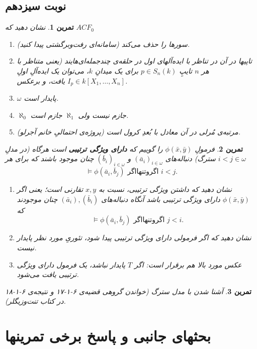 \documentclass[12pt,a4paper]{report}
\theoremstyle{colorhead}
\newtheorem{tam}{تمرین}
\begin{document}
\section{نوبت سیزدهم}
\begin{tam}
نشان دهید که
$ACF_0$
\begin{enumerate}
\item 
سورها را حذف می‌کند (سامانه‌ای رفت‌وبرگشتی پیدا کنید).
\item 
تاپیها در آن در تناظر با ایده‌آلهای اول در حلقه‌ی چندجمله‌ای‌‌هایند (یعنی متناظر با هر
$n$
تایپِ
$p\in S_n(k)$
برای یک میدانِ
$k$،
می‌توان یک ایده‌آلِ اولِ
$I_p\in k[X_1,\ldots,X_n]$
یافت، و  برعکس. 
\item 
$\omega$
پایدار است.
\item 
$\aleph_0$
جازم نیست ولی 
$\aleph_1$
جازم است.
\item 
مرتبه‌ی مُرلی در آن معادل با  بُعدِ کرول است (پروژه‌ی احتمالیِ خانم آجرلو).
\end{enumerate}
\end{tam}
\begin{tam}
فرمولِ
$\phi(\bar{x},\bar{y})$
را گوییم که\textbf{ دارای ویژگی ترتیبی} است هرگاه 
(در مدلِ سترگ) دنباله‌های
$(\bar{a}_i)_{i\in \omega}$
و
$(\bar{b}_i)_{i\in \omega}$
چنان موجود باشند که برای هر
$i<j\in \omega$
\[
\models \phi(\bar{a}_i,\bar{b}_j)
\text{ اگروتنهااگر } i<j.
\]
\begin{enumerate}
\item 
نشان دهید که داشتن ویژگی ترتیبی، نسبت به
$x,y$
تقارنی است؛ یعنی اگر
$\phi(\bar{x},\bar{y})$
دارای ویژگی ترتیبی باشد آنگاه دنباله‌های
$(\bar{a}_i),(\bar{b}_i)$
چنان موجودند که 
\[
\models \phi(\bar{a}_i,\bar{b}_j) \text{   اگروتنهااگر } j<i.
\]
\item 
نشان دهید که اگر فرمولی دارای ویژگی ترتیبی پیدا شود، تئوریِ مورد نظر پایدار نیست. 
\item 
عکس مورد بالا هم برقرار است: اگر 
$T$
پایدار نباشد، یک فرمول دارای ویژگی ترتیبی یافت می‌شود. 
\end{enumerate}
\end{tam}
\begin{tam}
آشنا شدن با مدل سترگ (خواندن گروهی قضیه‌ی ۶-۱-۱۷ و نتیجه‌ی ۶-۱-۱۸ در کتاب تنت‌و‌زیگلر).
\end{tam}
\chapter{بحثهای جانبی و پاسخ برخی تمرینها}
\end{document}
